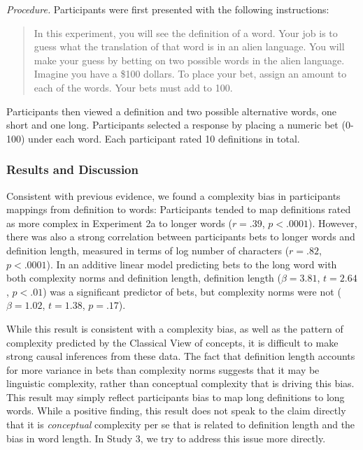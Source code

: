 {\it Procedure.} 
Participants were first presented with the following instructions:
\begin{quote}
In this experiment, you will see the definition of a word. Your job is to guess what the translation of that word is in an alien language. You will make your guess by betting on two possible words in the alien language. Imagine you have a \$100 dollars. To place your bet, assign an amount to each of the words. Your bets must add to 100.
\end{quote}
Participants then viewed a definition and two possible alternative words, one short and one long. Participants selected a response by placing a numeric bet (0-100) under each word.  Each participant rated 10 definitions in total. 

\subsubsection{Results and Discussion}
Consistent with previous evidence, we found a complexity bias in participants mappings from definition to words: Participants tended to map definitions rated as more complex in Experiment 2a to longer words ($r = .39$,  $p< .0001$). However, there was also a strong correlation between participants bets to longer words and definition length, measured in terms of log number of characters ($r = .82$, $p< .0001$). In an additive linear model predicting bets to the long word with both complexity norms and definition length, definition length ($\beta=3.81$, $t =2.64$, $p<.01$) was a significant predictor of bets, but complexity norms were not ($\beta=1.02$, $t =1.38$, $p=.17$). 

While this result is consistent with a complexity bias, as well as the pattern of complexity predicted by the Classical View of concepts, it is difficult to make strong causal inferences from these data. The fact that definition length accounts for more variance in bets than complexity norms suggests that it may be linguistic complexity, rather than conceptual complexity that is driving this bias. This result may simply reflect participants bias to map long definitions to long words. While a positive finding, this result does not speak to the claim directly that it is {\it conceptual} complexity per se that is related to definition length and the bias in word length. In Study 3, we try to address this issue more directly. 

